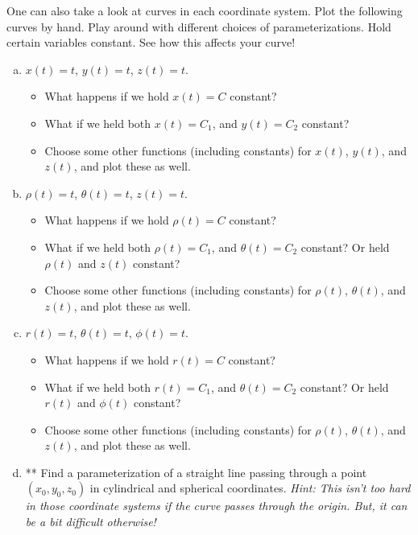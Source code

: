 \documentclass[12pt]{article} %
\begin{document}
\vspace*{1cm}
\begin{problem}
One can also take a look at curves in each coordinate system.  Plot the following curves by hand. Play around with different choices of parameterizations. Hold certain variables constant. See how this affects your curve!
\begin{enumerate}[(a)]
    \item $x(t)=t$, $y(t)=t$, $z(t)=t$.
    \begin{itemize}
        \item What happens if we hold $x(t)=C$ constant? 
        \item What if we held both $x(t)=C_1$, and $y(t)=C_2$ constant?
        \item Choose some other functions (including constants) for $x(t)$, $y(t)$, and $z(t)$, and plot these as well.
    \end{itemize}
    \item $\rho(t)=t$, $\theta(t)=t$, $z(t)=t$.
    \begin{itemize}
        \item What happens if we hold $\rho(t)=C$ constant? 
        \item What if we held both $\rho(t)=C_1$, and $\theta(t)=C_2$ constant? Or held $\rho(t)$ and $z(t)$ constant?
        \item Choose some other functions (including constants) for $\rho(t)$, $\theta(t)$, and $z(t)$, and plot these as well.
    \end{itemize}
    \item $r(t)=t$, $\theta(t)=t$, $\phi(t)=t$.
    \begin{itemize}
        \item What happens if we hold $r(t)=C$ constant? 
        \item What if we held both $r(t)=C_1$, and $\theta(t)=C_2$ constant? Or held $r(t)$ and $\phi(t)$ constant?
        \item Choose some other functions (including constants) for $\rho(t)$, $\theta(t)$, and $z(t)$, and plot these as well.
    \end{itemize}
    \item ** Find a parameterization of a straight line passing through a point $(x_0,y_0,z_0)$ in cylindrical and spherical coordinates. \emph{Hint: This isn't too hard in those coordinate systems if the curve passes through the origin. But, it can be a bit difficult otherwise!}
\end{enumerate}
\end{problem}
\end{document}
